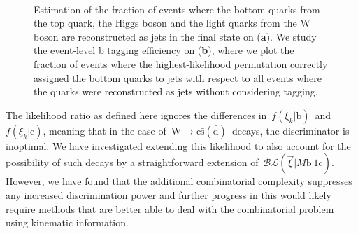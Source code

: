 \begin{figure}
\begin{centering}
\\
\caption{Estimation of the fraction of events where the bottom quarks from the top quark, the Higgs boson and the light quarks from the W boson are reconstructed as jets in the final state on (\textbf{a}). We study the event-level b tagging efficiency on (\textbf{b}), where we plot the fraction of events where the highest-likelihood permutation correctly assigned the bottom quarks to jets with respect to all events where the quarks were reconstructed as jets without considering tagging.}
\label{fig:blr_matching}
\end{centering}
\end{figure}
 
The likelihood ratio as defined here ignores the differences in~$f(\xi_k | \mathrm{b})$~and~$f(\xi_k | \mathrm{c})$, meaning that in the case of~$\mathrm{W} \rightarrow \mathrm{c}\bar{\mathrm{s}} (\bar{\mathrm{d}})$~decays, the discriminator is inoptimal. We have investigated extending this likelihood to also account for the possibility of such decays by a straightforward extension of~$\mathcal{BL}(\vec{\xi} | M\mathrm{b}~1\mathrm{c})$. However, we have found that the additional combinatorial complexity suppresses any increased discrimination power and further progress in this would likely require methods that are better able to deal with the combinatorial problem using kinematic information.

